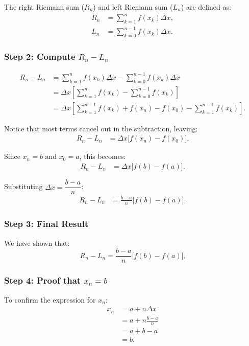 \documentclass{article}
\begin{document}
The right Riemann sum ($R_n$) and left Riemann sum ($L_n$) are defined as:
\begin{align*}
    R_n &= \sum_{k=1}^{n} f(x_k) \Delta x, \\
    L_n &= \sum_{k=0}^{n-1} f(x_k) \Delta x.
\end{align*}

\subsubsection*{Step 2: Compute $R_n - L_n$}
\begin{align*}
    R_n - L_n &=  \sum_{k=1}^{n} f(x_k)\Delta x - \sum_{k=0}^{n-1} f(x_k)\Delta x \\
    &=\Delta x \left[ \sum_{k=1}^{n} f(x_k) - \sum_{k=0}^{n-1} f(x_k) \right]\\
    &=\Delta x \left[ \sum_{k=1}^{n-1} f(x_k) + f(x_n) - f(x_0) - \sum_{k=1}^{n-1} f(x_k) \right].
\end{align*}

Notice that most terms cancel out in the subtraction, leaving:
\begin{align*}
    R_n - L_n &= \Delta x \bigl[f(x_n) - f(x_0)\bigr].
\end{align*}

Since $x_n = b$ and $x_0 = a$, this becomes:
\begin{align*}
    R_n - L_n &= \Delta x \bigl[f(b) - f(a)\bigr].
\end{align*}

Substituting $\Delta x = \dfrac{b - a}{n}$:
\begin{align*}
    R_n - L_n &= \frac{b - a}{n}\bigl[f(b) - f(a)\bigr].
\end{align*}

\subsubsection*{Step 3: Final Result}
We have shown that:
\[
    R_n - L_n = \frac{b - a}{n}\bigl[f(b) - f(a)\bigr].
\]

\subsubsection*{Step 4: Proof that $x_n=b$}
To confirm the expression for $x_n$:
\begin{align*}
    x_n &= a + n\Delta x \\
        &= a + n\frac{b - a}{n} \\
        &= a + b - a \\
        &= b.
\end{align*}
\end{document}
